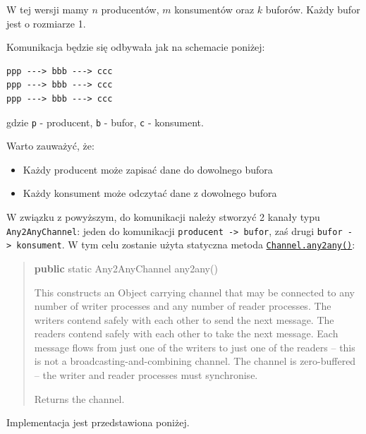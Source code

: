 \documentclass[11pt]{article}
\providecommand{\tightlist}{%
      \setlength{\itemsep}{0pt}\setlength{\parskip}{0pt}}
\newenvironment{Shaded}{}{}
\newcommand{\KeywordTok}[1]{\textcolor[rgb]{0.00,0.44,0.13}{\textbf{{#1}}}}
\newcommand{\DataTypeTok}[1]{\textcolor[rgb]{0.56,0.13,0.00}{{#1}}}
\newcommand{\FunctionTok}[1]{\textcolor[rgb]{0.02,0.16,0.49}{{#1}}}
\newcommand{\NormalTok}[1]{{#1}}
\newcommand{\OperatorTok}[1]{\textcolor[rgb]{0.40,0.40,0.40}{{#1}}}
\begin{document}
W tej wersji mamy \(n\) producentów, \(m\) konsumentów oraz \(k\)
buforów. Każdy bufor jest o rozmiarze 1.

Komunikacja będzie się odbywała jak na schemacie poniżej:

\begin{verbatim}
ppp ---> bbb ---> ccc
ppp ---> bbb ---> ccc
ppp ---> bbb ---> ccc
\end{verbatim}

gdzie \texttt{p} - producent, \texttt{b} - bufor, \texttt{c} -
konsument.

Warto zauważyć, że:

\begin{itemize}
\tightlist
\item
  Każdy producent może zapisać dane do dowolnego bufora
\item
  Każdy konsument może odczytać dane z dowolnego bufora
\end{itemize}

W związku z powyższym, do komunikacji należy stworzyć 2 kanały typu
\texttt{Any2AnyChannel}: jeden do komunikacji
\texttt{producent\ -\textgreater{}\ bufor}, zaś drugi
\texttt{bufor\ -\textgreater{}\ konsument}. W tym celu zostanie użyta
statyczna metoda
\href{https://www.cs.kent.ac.uk/projects/ofa/jcsp/jcsp-1.1-rc4/jcsp-doc/org/jcsp/lang/Channel.html\#any2any()}{\texttt{Channel.any2any()}}:

\begin{quote}
\begin{Shaded}
\begin{Highlighting}[]
\KeywordTok{public} \DataTypeTok{static}\NormalTok{ Any2AnyChannel }\FunctionTok{any2any}\OperatorTok{()}
\end{Highlighting}
\end{Shaded}

This constructs an Object carrying channel that may be connected to any
number of writer processes and any number of reader processes. The
writers contend safely with each other to send the next message. The
readers contend safely with each other to take the next message. Each
message flows from just one of the writers to just one of the readers --
this is not a broadcasting-and-combining channel. The channel is
zero-buffered -- the writer and reader processes must synchronise.

Returns the channel.
\end{quote}

Implementacja jest przedstawiona poniżej.
\end{document}
